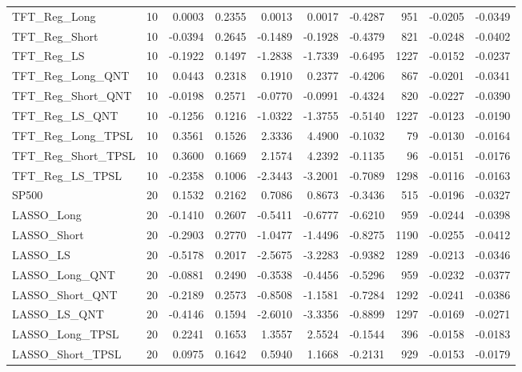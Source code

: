 \begin{tabular}{llrrrrrrrr}
TFT\_Reg\_Long & 10 & 0.0003 & 0.2355 & 0.0013 & 0.0017 & -0.4287 & 951 & -0.0205 & -0.0349 \\
\cline{1-10}
TFT\_Reg\_Short & 10 & -0.0394 & 0.2645 & -0.1489 & -0.1928 & -0.4379 & 821 & -0.0248 & -0.0402 \\
\cline{1-10}
TFT\_Reg\_LS & 10 & -0.1922 & 0.1497 & -1.2838 & -1.7339 & -0.6495 & 1227 & -0.0152 & -0.0237 \\
\cline{1-10}
TFT\_Reg\_Long\_QNT & 10 & 0.0443 & 0.2318 & 0.1910 & 0.2377 & -0.4206 & 867 & -0.0201 & -0.0341 \\
\cline{1-10}
TFT\_Reg\_Short\_QNT & 10 & -0.0198 & 0.2571 & -0.0770 & -0.0991 & -0.4324 & 820 & -0.0227 & -0.0390 \\
\cline{1-10}
TFT\_Reg\_LS\_QNT & 10 & -0.1256 & 0.1216 & -1.0322 & -1.3755 & -0.5140 & 1227 & -0.0123 & -0.0190 \\
\cline{1-10}
TFT\_Reg\_Long\_TPSL & 10 & 0.3561 & 0.1526 & 2.3336 & 4.4900 & -0.1032 & 79 & -0.0130 & -0.0164 \\
\cline{1-10}
TFT\_Reg\_Short\_TPSL & 10 & 0.3600 & 0.1669 & 2.1574 & 4.2392 & -0.1135 & 96 & -0.0151 & -0.0176 \\
\cline{1-10}
TFT\_Reg\_LS\_TPSL & 10 & -0.2358 & 0.1006 & -2.3443 & -3.2001 & -0.7089 & 1298 & -0.0116 & -0.0163 \\
\cline{1-10}
SP500 & 20 & 0.1532 & 0.2162 & 0.7086 & 0.8673 & -0.3436 & 515 & -0.0196 & -0.0327 \\
\cline{1-10}
LASSO\_Long & 20 & -0.1410 & 0.2607 & -0.5411 & -0.6777 & -0.6210 & 959 & -0.0244 & -0.0398 \\
\cline{1-10}
LASSO\_Short & 20 & -0.2903 & 0.2770 & -1.0477 & -1.4496 & -0.8275 & 1190 & -0.0255 & -0.0412 \\
\cline{1-10}
LASSO\_LS & 20 & -0.5178 & 0.2017 & -2.5675 & -3.2283 & -0.9382 & 1289 & -0.0213 & -0.0346 \\
\cline{1-10}
LASSO\_Long\_QNT & 20 & -0.0881 & 0.2490 & -0.3538 & -0.4456 & -0.5296 & 959 & -0.0232 & -0.0377 \\
\cline{1-10}
LASSO\_Short\_QNT & 20 & -0.2189 & 0.2573 & -0.8508 & -1.1581 & -0.7284 & 1292 & -0.0241 & -0.0386 \\
\cline{1-10}
LASSO\_LS\_QNT & 20 & -0.4146 & 0.1594 & -2.6010 & -3.3356 & -0.8899 & 1297 & -0.0169 & -0.0271 \\
\cline{1-10}
LASSO\_Long\_TPSL & 20 & 0.2241 & 0.1653 & 1.3557 & 2.5524 & -0.1544 & 396 & -0.0158 & -0.0183 \\
\cline{1-10}
LASSO\_Short\_TPSL & 20 & 0.0975 & 0.1642 & 0.5940 & 1.1668 & -0.2131 & 929 & -0.0153 & -0.0179 \\

\end{tabular}
